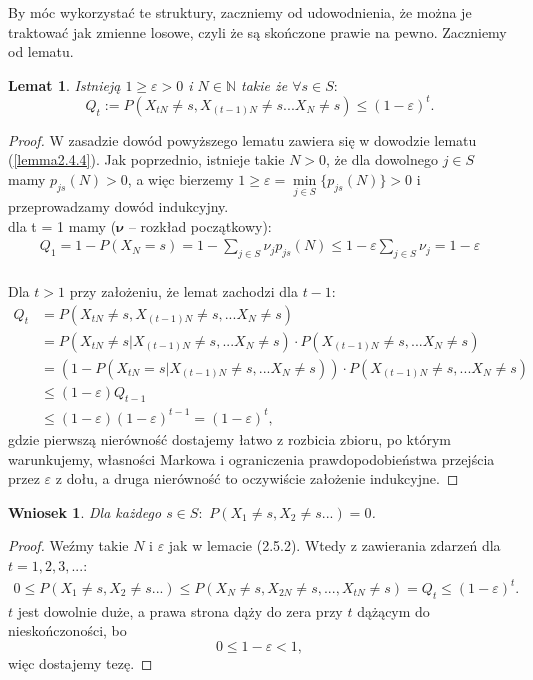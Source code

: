 \documentclass[a4paper]{article}
\theoremstyle{defn}
\theoremstyle{theorem}
\theoremstyle{lemma}
\newtheorem{lemma}[defn]{Lemat}
\theoremstyle{cor}
\newtheorem{cor}[defn]{Wniosek}
\theoremstyle{fact}
\begin{document}
By móc wykorzystać te struktury, zaczniemy od udowodnienia, że można je traktować jak zmienne losowe, czyli że są skończone prawie na pewno. Zaczniemy od lematu.
\begin{lemma}\label{lemma2.5.2}
Istnieją $1 \geq \varepsilon > 0$ i $N \in \mathbb{N}$ takie że $\forall s \in S:$
$$Q_t := P(X_{tN} \neq s, X_{(t-1)N} \neq s ... X_N \neq s) \leq (1-\varepsilon)^t.$$
\end{lemma}
\begin{proof}
W zasadzie dowód powyższego lematu zawiera się w dowodzie lematu (\ref{lemma2.4.4}). Jak poprzednio, istnieje takie $N > 0$, że dla dowolnego $j \in S$ mamy $p_{js}(N) > 0$, a więc bierzemy $1 \geq \varepsilon = \min\limits_{j \in S} \{p_{js}(N)\} > 0$ i przeprowadzamy dowód indukcyjny.\\
dla t = 1 mamy ($\boldsymbol{\nu}$ – rozkład początkowy):\\
\begin{align*}
Q_1 = 1 - P(X_N = s) = 1 - \sum _{j \in S} \nu_jp_{js}(N) \leq 1 - \varepsilon \sum _{j \in S} \nu_j = 1 - \varepsilon
\end{align*}
\\
Dla $t > 1$ przy założeniu, że lemat zachodzi dla $t-1$:
\begin{align*}
Q_{t} &= P(X_{tN} \neq s, X_{(t-1)N} \neq s, ... X_N \neq s) \\
&= P(X_{tN} \neq s | X_{(t-1)N} \neq s, ... X_N \neq s) \cdot P(X_{(t-1)N} \neq s, ... X_N \neq s) \\
&= (1 - P(X_{tN} = s | X_{(t-1)N} \neq s, ... X_N \neq s)) \cdot P(X_{(t-1)N} \neq s, ... X_N \neq s) \\
&\leq (1-\varepsilon) Q_{t-1}   \\
&\leq  (1-\varepsilon)(1-\varepsilon)^{t-1} = (1-\varepsilon)^t ,
\end{align*}
gdzie pierwszą nierówność dostajemy łatwo z rozbicia zbioru, po którym warunkujemy, własności Markowa i ograniczenia prawdopodobieństwa przejścia  przez $\varepsilon$ z dołu, a druga nierówność to oczywiście założenie indukcyjne.
\end{proof}
\begin{cor}\label{cor2.5.3}
Dla każdego $s \in S: \,\, P(X_{1} \neq s, X_2 \neq s ...) = 0$.
\end{cor}
\begin{proof}
Weźmy takie $N$ i $\varepsilon$ jak w lemacie (2.5.2). Wtedy z zawierania zdarzeń dla $t = 1,2,3,...$:
\begin{align*}
0 \leq P(X_{1} \neq s, X_2 \neq s ...) \leq P(X_N \neq s, X_{2N} \neq s, ..., X_{tN} \neq s) = Q_t \leq (1-\varepsilon)^t.
\end{align*}
$t$ jest dowolnie duże, a prawa strona dąży do zera przy $t$ dążącym do nieskończoności, bo $$0 \leq 1 - \varepsilon < 1,$$ więc dostajemy tezę.
\end{proof}
\end{document}
